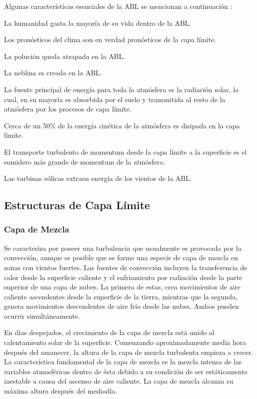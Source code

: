 Algunas características esenciales de la ABL se mencionan a continuación \citep{stull1988introduction}:
\begin{itemize*}
	\item La humanidad gasta la mayoría de su vida dentro de la ABL.
	\item Los pronósticos del clima son en verdad pronósticos de la capa límite.
	\item La polución queda atrapada en la ABL.
	\item La neblina es creada en la ABL.
	\item La fuente principal de energía para toda la atmósfera es la radiación solar, la cual, en su mayoría es absorbida por el suelo y transmitida al resto de la atmósfera por los procesos de capa límite.
	\item Cerca de un 50\% de la energía cinética de la atmósfera es disipada en la capa límite.
	\item El transporte turbulento de momentum desde la capa límite a la superficie es el sumidero más grande de momentum de la atmósfera.
	\item Las turbinas eólicas extraen energía de los vientos de la ABL.
\end{itemize*}
\subsection{Estructuras de Capa Límite}
\subsubsection{Capa de Mezcla}
Se caracteriza por poseer una turbulencia que usualmente es provocada por la convección, aunque es posible que se forme una especie de capa de mezcla en zonas con vientos fuertes. Las fuentes de convección incluyen la transferencia de calor desde la superficie caliente y el enfriamiento por radiación desde la parte superior de una capa de nubes. La primera de estas, crea movimientos de aire caliente ascendentes desde la superficie de la tierra, mientras que la segunda, genera movimientos descendentes de aire frío desde las nubes. Ambos pueden ocurrir simultáneamente.

En días despejados, el crecimiento de la capa de mezcla está unido al calentamiento solar de la superficie. Comenzando aproximadamente media hora después del amanecer, la altura de la capa de mezcla turbulenta empieza a crecer. La característica fundamental de la capa de mezcla es la mezcla intensa de las variables atmosféricas dentro de ésta debido a su condición de ser estáticamente inestable a causa del ascenso de aire caliente. La capa de mezcla alcanza su máxima altura después del mediodía.

